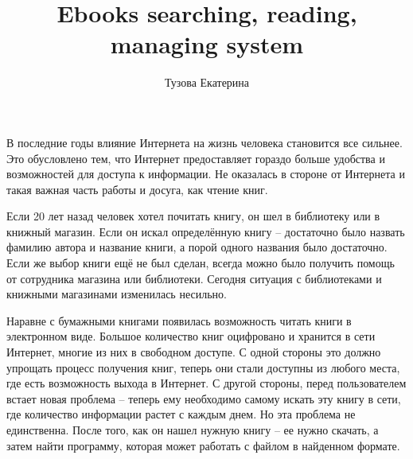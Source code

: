 \documentclass[a4paper]{report}
\begin{document}
\author{Тузова Екатерина}
\title{Ebooks searching, reading, managing system}

\maketitle


\newpage
\tableofcontents
\newpage

В последние годы влияние Интернета на жизнь человека становится все сильнее. Это обусловлено тем, что Интернет предоставляет гораздо больше удобства и возможностей для доступа к информации. Не оказалась в стороне от Интернета и такая важная часть работы и досуга, как чтение книг.

 Если 20 лет назад человек хотел почитать книгу, он шел в библиотеку или в книжный магазин. Если он искал определённую книгу -- достаточно было назвать фамилию автора и название книги, а порой одного названия было достаточно. Если же выбор книги ещё не был сделан, всегда можно было получить помощь от сотрудника магазина или библиотеки. Сегодня ситуация с библиотеками и книжными магазинами изменилась несильно. 

Наравне с бумажными книгами появилась возможность читать книги в электронном виде. Большое количество книг оцифровано и хранится в сети Интернет, многие из них в свободном доступе. С одной стороны это должно упрощать процесс получения книг, теперь они стали доступны из любого места, где есть возможность выхода в Интернет. С другой стороны, перед пользователем встает новая проблема -- теперь ему необходимо самому искать эту книгу в сети, где количество информации растет с каждым днем. Но эта проблема не единственна. После того, как он нашел нужную книгу -- ее нужно скачать, а затем найти программу, которая может работать с файлом в найденном формате. 
\end{document}
